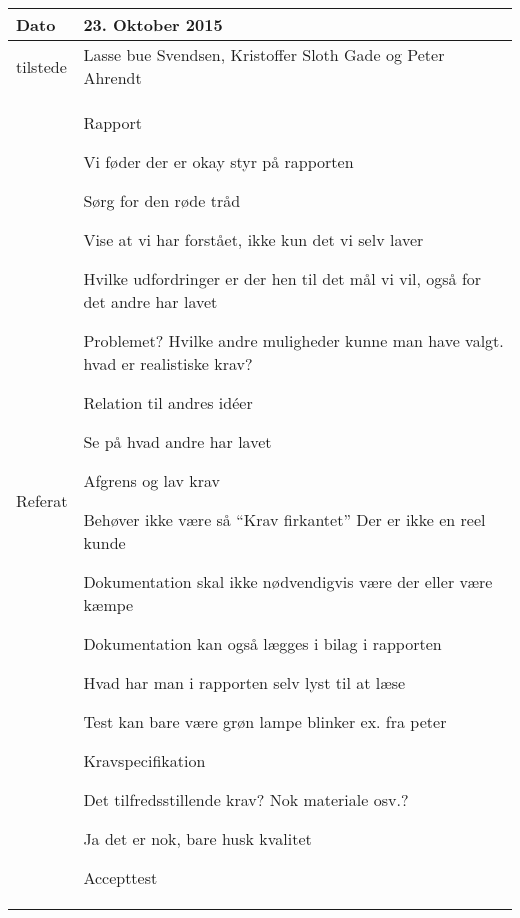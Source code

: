 \begin{center}
	\begin{tabular}{| l | p{10cm} |}
		\hline
		Dato		& 23. Oktober 2015\\ \hline
		tilstede 	& Lasse bue Svendsen, Kristoffer Sloth Gade og Peter Ahrendt\\ \hline
		Referat		& \vspace{-5mm}\begin{myEnumerate}
			\item Rapport
			\begin{myItemize}				
				\item Vi føder der er okay styr på rapporten
				\item Sørg for den røde tråd
				\item Vise at vi har forstået, ikke  kun det vi selv laver
				\item Hvilke udfordringer er der hen til det mål vi vil, også for det andre har lavet
				\item Problemet? Hvilke andre muligheder kunne man have valgt. hvad er realistiske krav?
				\item Relation til andres idéer
				\item Se på hvad andre har lavet
				\begin{myItemize}
					\item Afgrens og lav krav
				\end{myItemize}
				\item Behøver ikke være så “Krav firkantet” Der er ikke en reel kunde
				\item Dokumentation skal ikke nødvendigvis være der eller være kæmpe
				\item Dokumentation kan også lægges i bilag i rapporten
				\item Hvad har man i rapporten selv lyst til at læse
				\item Test kan bare være grøn lampe blinker ex. fra peter		
			\end{myItemize}
			\item Kravspecifikation
			\begin{myItemize}
				\item Det tilfredsstillende krav? Nok materiale osv.?
				\begin{myItemize}
					\item Ja det er nok, bare husk kvalitet
				\end{myItemize}
			\end{myItemize}
			\item Accepttest
			\begin{myItemize}

\end{myItemize}
\end{myEnumerate}
\end{tabular}
\end{center}
